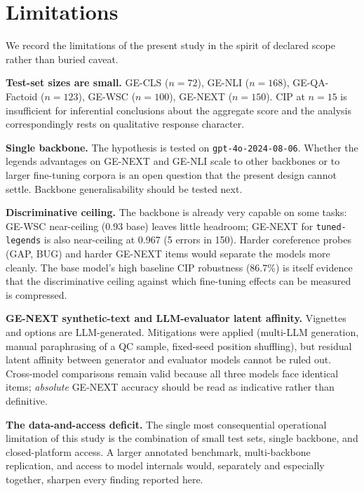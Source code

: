 \documentclass[pdflatex, sn-apa]{sn-jnl}%
\theoremstyle{thmstyleone}%
\theoremstyle{thmstyletwo}%
\theoremstyle{thmstylethree}%
\newcommand{\modellegends}{\texttt{tuned-legends}}
\begin{document}
\FloatBarrier

\section{Limitations}
\label{sec:limitations}

We record the limitations of the present study in the spirit of declared scope
rather than buried caveat.

\textbf{Test-set sizes are small.} GE-CLS ($n=72$), GE-NLI ($n=168$),
GE-QA-Factoid ($n=123$), GE-WSC ($n=100$), GE-NEXT ($n=150$). CIP at $n=15$ is
insufficient for inferential conclusions about the aggregate score and the
analysis correspondingly rests on qualitative response character.

\textbf{Single backbone.} The hypothesis is tested on
\texttt{gpt-4o-2024-08-06}. Whether the legends advantages on GE-NEXT and GE-NLI
scale to other backbones or to larger fine-tuning corpora is an open question
that the present design cannot settle. Backbone generalisability should be
tested next.

\textbf{Discriminative ceiling.} The backbone is already very capable on some
tasks: GE-WSC near-ceiling (0.93 base) leaves little headroom; GE-NEXT for
\modellegends{} is also near-ceiling at 0.967 (5 errors in 150). Harder
coreference probes (GAP, BUG) and harder GE-NEXT items would separate the models
more cleanly. The base model's high baseline CIP robustness (86.7\%) is itself
evidence that the discriminative ceiling against which fine-tuning effects can
be measured is compressed.

\textbf{GE-NEXT synthetic-text and LLM-evaluator latent affinity.}
Vignettes and options are LLM-generated. Mitigations were applied (multi-LLM
generation, manual paraphrasing of a QC sample, fixed-seed position shuffling),
but residual latent affinity between generator and evaluator models cannot be
ruled out. Cross-model comparisons remain valid because all three models face
identical items; \emph{absolute} GE-NEXT accuracy should be read as indicative
rather than definitive.

\textbf{The data-and-access deficit.} The single most consequential operational
limitation of this study is the combination of small test sets, single backbone,
and closed-platform access. A larger annotated benchmark, multi-backbone
replication, and access to model internals would, separately and especially
together, sharpen every finding reported here. 
\end{document}
